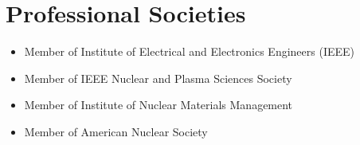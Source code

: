 \documentclass[letterpaper,11pt]{article} %
\begin{document}
\section{Professional Societies}
\begin{itemize}
    \item Member of Institute of Electrical and Electronics Engineers (IEEE)
    \item Member of IEEE Nuclear and Plasma Sciences Society
    \item Member of Institute of Nuclear Materials Management
    \item Member of American Nuclear Society
\end{itemize}
\end{document}
